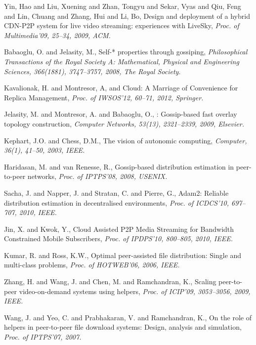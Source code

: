 {\begin{thebibliography}{5}
Yin, Hao and Liu, Xuening and Zhan, Tongyu and Sekar, Vyas and Qiu, Feng and Lin, Chuang and Zhang, Hui and Li, Bo,
\newblock Design and deployment of a hybrid {CDN-P2P} system for live video streaming: experiences with {LiveSky},
\newblock \emph{Proc. of Multimedia'09, 25--34, 2009, ACM.}

Babaoglu, O. and Jelasity, M.,
\newblock Self-* properties through gossiping,
\newblock \emph{Philosophical Transactions of the Royal Society A: Mathematical, Physical and Engineering Sciences, 366(1881), 3747--3757, 2008, The Royal Society.}

Kavalionak, H. and Montresor, A,
 and Cloud: A Marriage of Convenience for Replica Management,
\newblock \emph{Proc. of IWSOS'12, 60--71, 2012, Springer.}

Jelasity, M. and Montresor, A. and Babaoglu, O.,
: Gossip-based fast overlay topology construction,
\newblock \emph{Computer Networks, 53(13), 2321--2339, 2009, Elsevier.}

Kephart, J.O. and Chess, D.M.,
\newblock The vision of autonomic computing,
\newblock \emph{Computer, 36(1), 41--50, 2003, IEEE.}

Haridasan, M. and van Renesse, R.,
\newblock Gossip-based distribution estimation in peer-to-peer networks,
\newblock \emph{Proc. of IPTPS'08, 2008, USENIX.}

Sacha, J. and Napper, J. and Stratan, C. and Pierre, G.,
\newblock Adam2: Reliable distribution estimation in decentralised environments,
\newblock \emph{Proc. of ICDCS'10, 697--707, 2010, IEEE.}

Jin, X. and Kwok, Y.,
\newblock Cloud Assisted {P2P} Media Streaming for Bandwidth Constrained Mobile Subscribers,
\newblock \emph{Proc. of IPDPS'10, 800--805, 2010, IEEE.}

Kumar, R. and Ross, K.W.,
\newblock Optimal peer-assisted file distribution: Single and multi-class problems,
\newblock \emph{Proc. of HOTWEB'06, 2006, IEEE.}

Zhang, H. and Wang, J. and Chen, M. and Ramchandran, K.,
\newblock Scaling peer-to-peer video-on-demand systems using helpers,
\newblock \emph{Proc. of ICIP'09, 3053--3056, 2009, IEEE.}

Wang, J. and Yeo, C. and Prabhakaran, V. and Ramchandran, K.,
\newblock On the role of helpers in peer-to-peer file download systems: Design, analysis and simulation,
\newblock \emph{Proc. of IPTPS'07, 2007.}


\end{thebibliography}}
